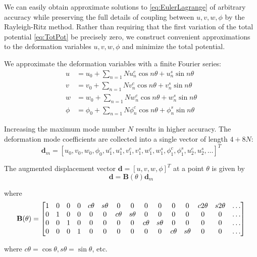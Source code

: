 \documentclass[\rootdir/thesis.tex]{subfiles}
\begin{document}
We can easily obtain approximate solutions to \eqref{eq:EulerLagrange} of arbitrary accuracy while preserving the full details of coupling between $u,v,w,\phi$ by the Rayleigh-Ritz method. Rather than requiring that the first variation of the total potential \eqref{eq:TotPot} be precisely zero, we construct convenient approximations to the deformation variables $u,v,w,\phi$ and minimize the total potential.

We approximate the deformation variables with a finite Fourier series:
\begin{align}
\label{eq:mm_FourierDef}
u &= u_0 + \sum_{n=1}{N} u_n^c \cos{n\theta} + u_n^s \sin{n\theta}\\
v &= v_0 + \sum_{n=1}{N} v_n^c \cos{n\theta} + v_n^s \sin{n\theta}\\
w &= w_0 + \sum_{n=1}{N} w_n^c \cos{n\theta} + w_n^s \sin{n\theta}\\
\phi &= \phi_0 + \sum_{n=1}{N} \phi_n^c \cos{n\theta} + \phi_n^s \sin{n\theta}
\end{align}

Increasing the maximum mode number $N$ results in higher accuracy. The deformation mode coefficients are collected into a single vector of length $4+8N$:
\begin{equation}
\mathbf{d}_m = [u_0,v_0,w_0,\phi_0,u_1^c,u_1^s,v_1^c,v_1^s,w_1^c,w_1^s,\phi_1^c,\phi_1^s,u_2^c,u_2^s,\dots]^T
\end{equation}

The augmented displacement vector $\mathbf{d}=[u,v,w,\phi]^T$ at a point $\theta$ is given by
\begin{equation}
\label{eq:u_Bd}
\mathbf{d} = \mathbf{B}(\theta)\mathbf{d}_m
\end{equation}

where
\begin{equation}
\setcounter{MaxMatrixCols}{16}
\mathbf{B}(\theta) =
\begin{bmatrix}
1 & 0 & 0 & 0 & c\theta & s\theta & 0 & 0 & 0 & 0 & 0 & 0 & c2\theta & s2\theta & \dots\\
0 & 1 & 0 & 0 & 0 & 0 & c\theta & s\theta & 0 & 0 & 0 & 0 & 0 & 0 & \dots\\
0 & 0 & 1 & 0 & 0 & 0 & 0 & 0 & c\theta & s\theta & 0 & 0 & 0 & 0 & \dots\\
0 & 0 & 0 & 1 & 0 & 0 & 0 & 0 & 0 & 0 & c\theta & s\theta & 0 & 0 & \dots
\end{bmatrix}
\end{equation}

where $c\theta=\cos{\theta}, s\theta=\sin{\theta}$, etc.
\end{document}
